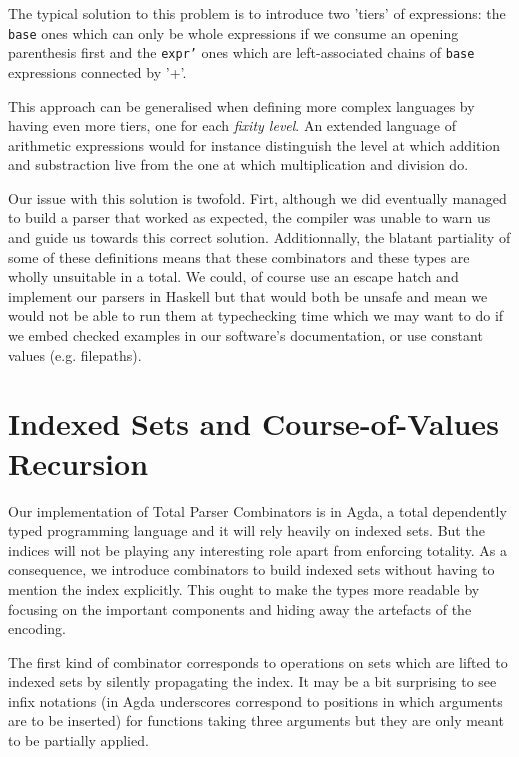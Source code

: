 \documentclass[sigplan,review,anonymous]{acmart}\settopmatter{printfolios=true}
\newcommand{\shgrab}[1]{\medskip\ExecuteMetaData[parser.tex]{#1}}
\newcommand{\hgrab}[1]{\ExecuteMetaData[parser.tex]{#1}}
\newcommand{\parser}[1]{\texttt{#1}}
\begin{document}
The typical solution to this problem is to introduce two 'tiers'
of expressions: the \parser{base} ones which can only be whole
expressions if we consume an opening parenthesis first and the
\parser{expr'} ones which are left-associated chains of \parser{base}
expressions connected by '+'.

\shgrab{base}
\hgrab{expr2}

This approach can be generalised when defining more complex
languages by having even more tiers, one for each
\emph{fixity level}. An extended language of arithmetic
expressions would for instance distinguish the level at
which addition and substraction live from the one at which
multiplication and division do.


Our issue with this solution is twofold. Firt, although we did
eventually managed to build a parser that worked as expected,
the compiler was unable to warn us and guide us towards this
correct solution. Additionnally, the blatant partiality of
some of these definitions means that these combinators and
these types are wholly unsuitable in a total. We could, of
course use an escape hatch and implement our parsers in Haskell
but that would both be unsafe and mean we would not be able
to run them at typechecking time which we may want to do if
we embed checked examples in our software's documentation,
or use constant values (e.g. filepaths).

\section{Indexed Sets and Course-of-Values Recursion}

Our implementation of Total Parser Combinators is in Agda,
a total dependently typed programming language and it will
rely heavily on indexed sets. But the indices will not be
playing any interesting role apart from enforcing totality.
As a consequence, we introduce combinators to build indexed
sets without having to mention the index explicitly. This
ought to make the types more readable by focusing on the
important components and hiding away the artefacts of the
encoding.

The first kind of combinator corresponds to operations on
sets which are lifted to indexed sets by silently propagating
the index. It may be a bit surprising to see infix notations
(in Agda underscores correspond to positions in which arguments
are to be inserted) for functions taking three arguments but
they are only meant to be partially applied.
\end{document}
